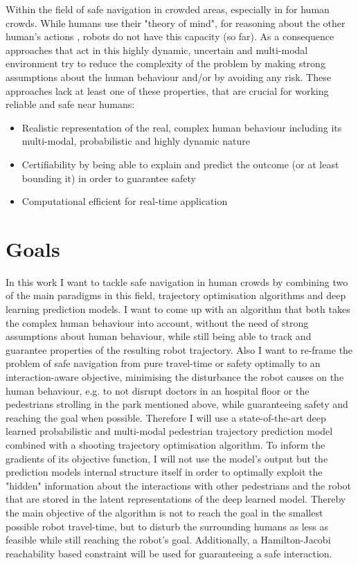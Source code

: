 Within the field of safe navigation in crowded areas, especially in for human crowds. While humans use their "theory of mind", for reasoning about the other human's actions \cite{Gweon2013}, robots do not have this capacity (so far). As a consequence approaches that act in this highly dynamic, uncertain and multi-modal environment try to reduce the complexity of the problem by making strong assumptions about the human behaviour and/or by avoiding any risk. These approaches lack at least one of these properties, that are crucial for working reliable and safe near humans: 

\begin{itemize}
\item Realistic representation of the real, complex human behaviour including its multi-modal, probabilistic and highly dynamic nature
\item Certifiability by being able to explain and predict the outcome (or at least bounding it) in order to guarantee safety 
\item Computational efficient for real-time application
\end{itemize}

\section{Goals}
\label{text:introduction/goals}
In this work I want to tackle safe navigation in human crowds by combining two of the main paradigms in this field, trajectory optimisation algorithms and deep learning prediction models. I want to come up with an algorithm that both takes the complex human behaviour into account, without the need of strong assumptions about human behaviour, while still being able to track and guarantee properties of the resulting robot trajectory. Also I want to re-frame the problem of safe navigation from pure travel-time or safety optimally to an interaction-aware objective, minimising the disturbance the robot causes on the human behaviour, e.g. to not disrupt doctors in an hospital floor or the pedestrians strolling in the park mentioned above, while guaranteeing safety and reaching the goal when possible.
\newline
Therefore I will use a state-of-the-art deep learned probabilistic and multi-modal pedestrian trajectory prediction model combined with a shooting trajectory optimisation algorithm. To inform the gradients of its objective function, I will not use the model's output but the prediction models internal structure itself in order to optimally exploit the "hidden" information about the interactions with other pedestrians and the robot that are stored in the latent representations of the deep learned model. Thereby the main objective of the algorithm is not to reach the goal in the smallest possible robot travel-time, but to disturb the surrounding humans as less as feasible while still reaching the robot's goal. Additionally, a Hamilton-Jacobi reachability based constraint will be used for guaranteeing a safe interaction.  

